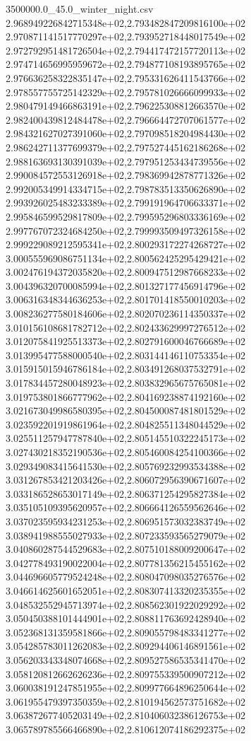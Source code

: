 \begin{filecontents*}{3500000.0_45.0_winter_night.csv}
2.968949226842715348e+02,2.793482847209816100e+02
2.970871141517770297e+02,2.793952718448017549e+02
2.972792951481726504e+02,2.794417472157720113e+02
2.974714656995959672e+02,2.794877108193895765e+02
2.976636258322835147e+02,2.795331626411543766e+02
2.978557755725142329e+02,2.795781026666099933e+02
2.980479149466863191e+02,2.796225308812663570e+02
2.982400439812484478e+02,2.796664472707061577e+02
2.984321627027391060e+02,2.797098518204984430e+02
2.986242711377699379e+02,2.797527445162186268e+02
2.988163693130391039e+02,2.797951253434739556e+02
2.990084572553126918e+02,2.798369942878771326e+02
2.992005349914334715e+02,2.798783513350626890e+02
2.993926025483233389e+02,2.799191964706633371e+02
2.995846599529817809e+02,2.799595296803336169e+02
2.997767072324684250e+02,2.799993509497326158e+02
2.999229089212595341e+02,2.800293172274268727e+02
3.000555969086751134e+02,2.800562425295429421e+02
3.002476194372035820e+02,2.800947512987668233e+02
3.004396320700085994e+02,2.801327177456914796e+02
3.006316348344636253e+02,2.801701418550010203e+02
3.008236277580184606e+02,2.802070236114350337e+02
3.010156108681782712e+02,2.802433629997276512e+02
3.012075841925513373e+02,2.802791600046766689e+02
3.013995477588000540e+02,2.803144146110753354e+02
3.015915015946786184e+02,2.803491268037532791e+02
3.017834457280048923e+02,2.803832965675765081e+02
3.019753801866777962e+02,2.804169238874192160e+02
3.021673049986580395e+02,2.804500087481801529e+02
3.023592201919861964e+02,2.804825511348044529e+02
3.025511257947787840e+02,2.805145510322245173e+02
3.027430218352190536e+02,2.805460084254100366e+02
3.029349083415641530e+02,2.805769232993534388e+02
3.031267853421203426e+02,2.806072956390671607e+02
3.033186528653017149e+02,2.806371254295827384e+02
3.035105109395620957e+02,2.806664126559562646e+02
3.037023595934231253e+02,2.806951573032383749e+02
3.038941988555027933e+02,2.807233593565279079e+02
3.040860287544529683e+02,2.807510188009200647e+02
3.042778493190022004e+02,2.807781356215455162e+02
3.044696605779524248e+02,2.808047098035276576e+02
3.046614625601652051e+02,2.808307413320235355e+02
3.048532552945713974e+02,2.808562301922029292e+02
3.050450388101444901e+02,2.808811763692428940e+02
3.052368131359581866e+02,2.809055798483341277e+02
3.054285783011262083e+02,2.809294406146891561e+02
3.056203343348074668e+02,2.809527586535341470e+02
3.058120812662626236e+02,2.809755339500907212e+02
3.060038191247851955e+02,2.809977664896250644e+02
3.061955479397350359e+02,2.810194562573751682e+02
3.063872677405203149e+02,2.810406032386126753e+02
3.065789785566466890e+02,2.810612074186292375e+02

\end{filecontents*}
